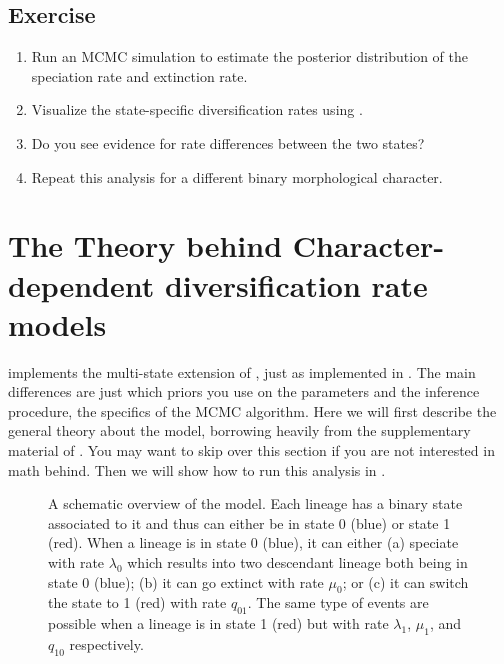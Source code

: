 


\subsection{Exercise}

\begin{enumerate}
\item Run an MCMC simulation to estimate the posterior distribution of the speciation rate and extinction rate.
\item Visualize the state-specific diversification rates using \R.
\item Do you see evidence for rate differences between the two states?
\item Repeat this analysis for a different binary morphological character.
\end{enumerate}


\bigskip
\section{The Theory behind Character-dependent diversification rate models}\label{sec:BiSSE_Theory}

\RevBayes implements the multi-state extension of \BiSSE, just as implemented in \diversitree. 
The main differences are just which priors you use on the parameters and the inference procedure, \IE the specifics of the MCMC algorithm.
Here we will first describe the general theory about the model, borrowing heavily from the supplementary material of \cite{Moore2016}.
You may want to skip over this section if you are not interested in math behind.
Then we will show how to run this analysis in \RevBayes.
\begin{figure}[h!]
\centering
{}
\caption{\small A schematic overview of the \BiSSE model. Each lineage has a binary state associated to it and thus can either be in state 0 (blue) or state 1 (red). When a lineage is in state 0 (blue), it can either (a) speciate with rate $\lambda_0$ which results into two descendant lineage both being in state 0 (blue); (b) it can go extinct with rate $\mu_0$; or (c) it can switch the state to 1 (red) with rate $q_{01}$. The same type of events are possible when a lineage is in state 1 (red) but with rate $\lambda_1$, $\mu_1$, and $q_{10}$ respectively.}
\label{fig:BiSSE_Schematic}
\end{figure}

